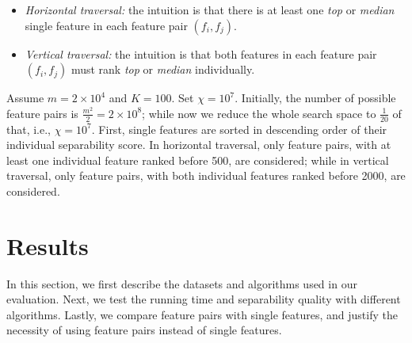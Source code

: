 \begin{itemize}
\item \emph{Horizontal traversal:} the intuition is that there is at least one {\em top} or {\em median} single feature in each \topk feature pair $(f_i,f_j)$.
\item \emph{Vertical traversal:}  the intuition is that both features in each \topk feature pair $(f_i,f_j)$ must rank {\em top} or {\em median} individually.
\end{itemize}



\begin{example}[\traversal]
Assume $m=2\times 10^4$ and $K=100$. Set $\chi=10^7$. Initially, the number of possible feature pairs is $\frac{m^2}{2}=2\times 10^8$; while now we reduce the whole search space to  $\frac{1}{20}$ of that,  i.e., $\chi=10^7$. First, single features are sorted in descending order of their individual separability score. In horizontal traversal, only feature pairs, with at least one individual feature ranked before 500, are considered; while in vertical traversal, only feature pairs, with both individual features ranked before 2000, are considered.
\end{example}



\section{Results}
\label{sec:exp}
In this section, we first describe the datasets and algorithms used in our evaluation. Next, we test the running time and separability quality with different algorithms. Lastly, we compare \topk feature pairs with \topk single features, and justify the necessity of using feature pairs instead of single features.
